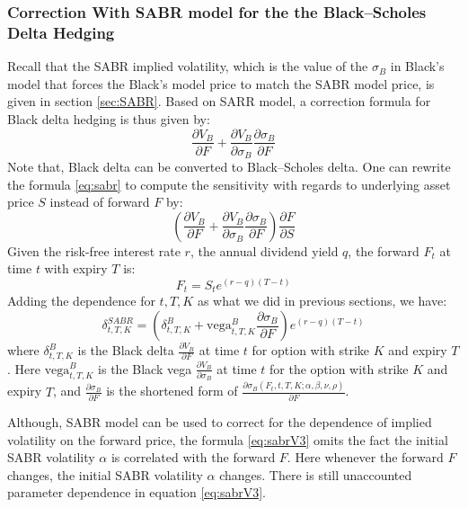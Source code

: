 \documentclass[letterpaper,12pt,titlepage,oneside,final]{book}
\numberwithin{equation}{section}
\theoremstyle{definition}
\begin{document}
\subsubsection{Correction With SABR model for the the Black–Scholes Delta Hedging}
Recall that the SABR implied volatility, which is the value of the $\sigma_B$ in Black's model that forces the Black's model price to match the SABR model price, is given in section \ref{sec:SABR}.
Based on SARR model, a correction formula for Black delta hedging is thus given by:
\begin{equation}
\frac{\partial V_{B}}{\partial F} + \frac{\partial V_{B}}{\partial \sigma_B}
\frac{\partial \sigma_B}{\partial F}
\label{eq:sabr}
\end{equation}
Note that, Black delta can be converted to Black–Scholes delta.
One can rewrite the formula \eqref{eq:sabr} to compute the sensitivity with regards to underlying asset price $S$ instead of forward $F$ by:
\begin{equation}
\left(\frac{\partial V_{B}}{\partial F} + \frac{\partial V_{B}}{\partial \sigma_B}
    \frac{\partial \sigma_B}{\partial F}\right)\frac{\partial  F}{\partial S}
    \label{eq:sabrV2}
    \end{equation}
 Given the risk-free interest rate $r$, the annual dividend yield $q$, the forward $F_t$ at time $t$ with expiry $T$ is: 
\[
        F_t=S_t e^{(r-q) (T-t)}
 \]
Adding the dependence for $t,T,K$ as what we did in previous sections, we  have:
\begin{equation}
    \delta^{SABR}_{t,T,K}=\left( \delta^{B}_{t,T,K}+\text{vega}^{B}_{t,T,K} \frac{\partial \sigma_B}{\partial F} \right)e^{(r-q) (T-t)}
    \label{eq:sabrV3}
\end{equation}
where 
$\delta^{B}_{t,T,K}$ is the Black delta $\frac{\partial V_{B}}{\partial F}$ at time $t$ for option with strike $K$ and expiry $T$. Here
$\text{vega}^{B}_{t,T,K}$ is the Black vega $\frac{\partial V_{B}}{\partial \sigma_{B}}$ at time $t$ for the option with strike $K$ and expiry $T$, and 
$\frac{\partial \sigma_B}{\partial F}$ is the shortened form  of $\frac{\partial\sigma_{B}(F_t,t,T,K;\alpha,\beta,\nu,\rho)}{\partial F}$.


Although, SABR model can be used to correct for the dependence of implied volatility on the forward price, the formula \eqref{eq:sabrV3} omits the fact the initial SABR volatility $\alpha$ is correlated with the forward $F$. Here whenever the forward $F$ changes,  the initial SABR volatility $\alpha$ changes.  There is still unaccounted parameter dependence  in  equation \eqref{eq:sabrV3}.
\end{document}
